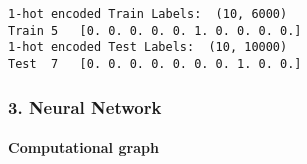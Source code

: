 \documentclass[11pt]{article}
\begin{document}
    \begin{Verbatim}[commandchars=\\\{\}]
1-hot encoded Train Labels:  (10, 6000)
Train 5   [0. 0. 0. 0. 0. 1. 0. 0. 0. 0.]
1-hot encoded Test Labels:  (10, 10000)
Test  7   [0. 0. 0. 0. 0. 0. 0. 1. 0. 0.]
    \end{Verbatim}

    \hypertarget{neural-network}{%
\subsubsection{3. Neural Network}\label{neural-network}}

\hypertarget{computational-graph}{%
\paragraph{Computational graph}\label{computational-graph}}
\end{document}
